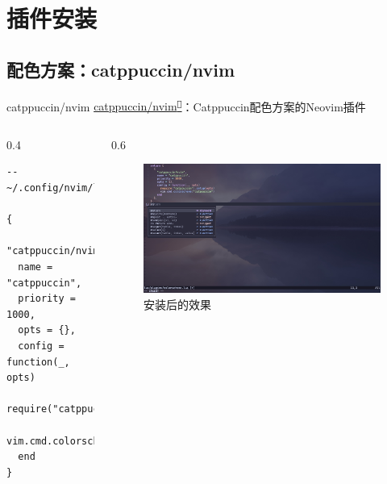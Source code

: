 \documentclass[aspectratio=169]{ctexbeamer}
\newcommand{\nerd}[1]{\texttt{#1}}
\newcommand{\link}[3][]{\href{#3}{#2\textsuperscript{\nerd{}}}}
\begin{document}
\section{插件安装}

  \subsection{配色方案：catppuccin/nvim}
    \begin{frame}[fragile]{catppuccin/nvim}
      \link{catppuccin/nvim}{https://github.com/catppuccin/nvim}：Catppuccin配色方案的Neovim插件

      \begin{columns}
        \begin{column}{0.4\linewidth}
          \begin{lstlisting}[basicstyle=\tiny\ttfamily]
-- ~/.config/nvim/lua/plugins/colorscheme.lua

{
  "catppuccin/nvim",
  name = "catppuccin",
  priority = 1000,
  opts = {},
  config = function(_, opts)
    require("catppuccin").setup(opts)
    vim.cmd.colorscheme("catppuccin")
  end
}
      \end{lstlisting}
        \end{column}

        \begin{column}{0.6\linewidth}
          \begin{figure}[H]
            \centering
            \includegraphics[width=\linewidth]{./Figures/Colorscheme_Finish.jpg}
            \caption{安装后的效果}%
          \end{figure}
        \end{column}
      \end{columns}

    \end{frame}
\end{document}
